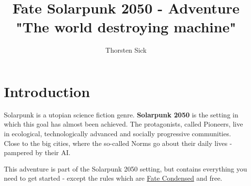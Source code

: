 \documentclass{book}
\title{Fate Solarpunk 2050 - Adventure "The world destroying machine"}
\author{Thorsten Sick}
\begin{document}

\chapter{Introduction}

Solarpunk is a utopian science fiction genre. \textbf{Solarpunk 2050} is the setting in which this goal has almost been achieved. The protagonists, called Pioneers, live in ecological, technologically advanced and socially progressive communities. Close to the big cities, where the so-called Norms go about their daily lives - pampered by their AI.

This adventure is part of the Solarpunk 2050 setting, but contains everything you need to get started - except the rules which are \hyperref[https://fate-srd.com/fate-condensed]{Fate Condensed} and free.





\end{document}

